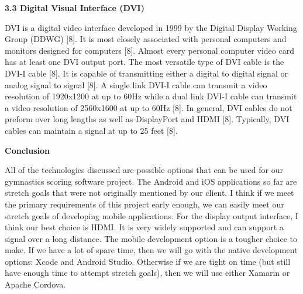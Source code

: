 \documentclass[letterpaper,10pt,draftclsnofoot,onecolumn,]{IEEEtran}
\begin{document}
\textbf{3.3 Digital Visual Interface (DVI)}
\par DVI is a digital video interface developed in 1999 by the Digital Display Working Group (DDWG) [8]. It is most closely associated with personal computers and monitors designed for computers [8]. Almost every personal computer video card has at least one DVI output port. The most versatile type of DVI cable is the DVI-I cable [8]. It is capable of transmitting either a digital to digital signal or analog signal to signal [8]. A single link DVI-I cable can transmit a video resolution of 1920x1200 at up to 60Hz while a dual link DVI-I cable can transmit a video resolution of 2560x1600 at up to 60Hz [8]. In general, DVI cables do not preform over long lengths as well as DisplayPort and HDMI [8]. Typically, DVI cables can maintain a signal at up to 25 feet [8].

\begin{center}
\textbf{Conclusion}\\
\end{center}
\par All of the technologies discussed are possible options that can be used for our gymnastics scoring software project. The Android and iOS applications so far are stretch goals that were not originally mentioned by our client. I think if we meet the primary requirements of this project early enough, we can easily meet our stretch goals of developing mobile applications. For the display output interface, I think our best choice is HDMI. It is very widely supported and can support a signal over a long distance. The mobile development option is a tougher choice to make. If we have a lot of spare time, then we will go with the native development options: Xcode and Android Studio. Otherwise if we are tight on time (but still have enough time to attempt stretch goals), then we will use either Xamarin or Apache Cordova.
\end{document}
